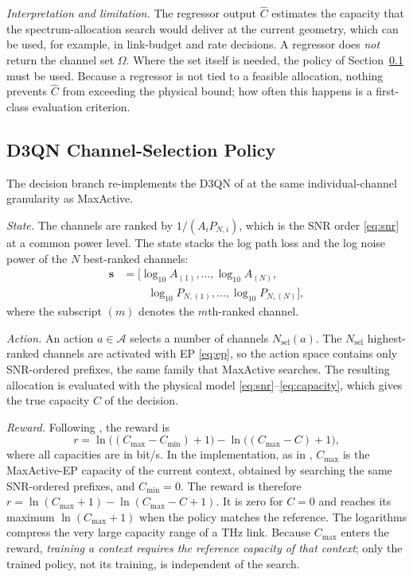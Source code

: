 \documentclass[correspondence]{IEEEtaes}
\begin{document}
\emph{Interpretation and limitation.} The regressor output $\hat C$ estimates the capacity
that the spectrum-allocation search would deliver at the current geometry, which can be
used, for example, in link-budget and rate decisions. A regressor does \emph{not} return
the channel set $\Omega$. Where the set itself is needed, the policy of
Section~\ref{sec:ml-d3qn} must be used. Because a regressor is not tied to a feasible
allocation, nothing prevents $\hat C$ from exceeding the physical bound; how often this
happens is a first-class evaluation criterion.

\subsection{D3QN Channel-Selection Policy}
\label{sec:ml-d3qn}
The decision branch re-implements the D3QN of \cite{elcik2025d3qn} at the same
individual-channel granularity as MaxActive.

\emph{State.} The channels are ranked by $1/(A_iP_{N,i})$, which is the SNR order
\eqref{eq:snr} at a common power level. The state stacks the log path loss and the log
noise power of the $N$ best-ranked channels:
\begin{align}
\mathbf{s}&=\big[\log_{10}A_{(1)},\dots,\log_{10}A_{(N)},\nonumber\\
&\qquad\ \log_{10}P_{N,(1)},\dots,\log_{10}P_{N,(N)}\big],
\label{eq:state}
\end{align}
where the subscript $(m)$ denotes the $m$th-ranked channel.

\emph{Action.} An action $a\in\mathcal{A}$ selects a number of channels
$N_{\text{sel}}(a)$. The $N_{\text{sel}}$ highest-ranked channels are activated with EP
\eqref{eq:ep}, so the action space contains only SNR-ordered prefixes, the same family that
MaxActive searches. The resulting allocation is evaluated with the physical model
\eqref{eq:snr}--\eqref{eq:capacity}, which gives the true capacity $C$ of the decision.

\emph{Reward.} Following \cite{elcik2025d3qn}, the reward is
\begin{equation}
r=\ln\!\big((C_{\max}-C_{\min})+1\big)-\ln\!\big((C_{\max}-C)+1\big),
\label{eq:reward}
\end{equation}
where all capacities are in bit/s. In the implementation, as in \cite{elcik2025d3qn},
$C_{\max}$ is the MaxActive-EP capacity of the current context, obtained by searching the
same SNR-ordered prefixes, and $C_{\min}=0$. The reward is therefore
$r=\ln(C_{\max}+1)-\ln(C_{\max}-C+1)$. It is zero for $C=0$ and reaches its maximum
$\ln(C_{\max}+1)$ when the policy matches the reference. The logarithms compress the very
large capacity range of a THz link. Because $C_{\max}$ enters the reward, \emph{training a
context requires the reference capacity of that context}; only the trained policy, not
its training, is independent of the search.
\end{document}
